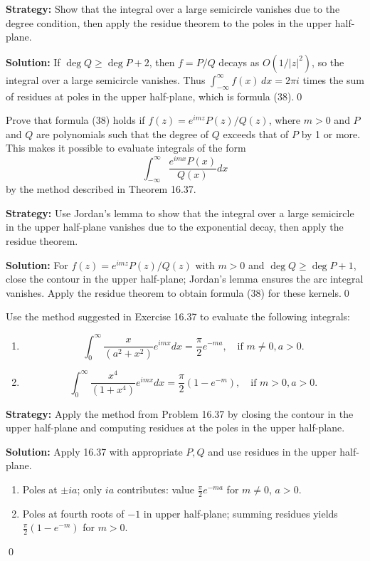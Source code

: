 \noindent\textbf{Strategy:} Show that the integral over a large semicircle vanishes due to the degree condition, then apply the residue theorem to the poles in the upper half-plane.

\bigskip\noindent\textbf{Solution:}
If $\deg Q\ge \deg P+2$, then $f=P/Q$ decays as $O(1/|z|^2)$, so the integral over a large semicircle vanishes. Thus $\int_{-\infty}^{\infty} f(x)\,dx=2\pi i$ times the sum of residues at poles in the upper half-plane, which is formula (38).\qed


\begin{problembox}
Prove that formula (38) holds if \( f(z) = e^{imz} P(z) / Q(z) \), where \( m > 0 \) and \( P \) and \( Q \) are polynomials such that the degree of \( Q \) exceeds that of \( P \) by 1 or more. This makes it possible to evaluate integrals of the form
\[ \int_{-\infty}^{\infty} \frac{e^{imx} P(x)}{Q(x)} dx \]
by the method described in Theorem 16.37.
\end{problembox}

\noindent\textbf{Strategy:} Use Jordan's lemma to show that the integral over a large semicircle in the upper half-plane vanishes due to the exponential decay, then apply the residue theorem.

\bigskip\noindent\textbf{Solution:}
For $f(z)=e^{imz}P(z)/Q(z)$ with $m>0$ and $\deg Q\ge \deg P+1$, close the contour in the upper half-plane; Jordan's lemma ensures the arc integral vanishes. Apply the residue theorem to obtain formula (38) for these kernels.\qed


\begin{problembox}
Use the method suggested in Exercise 16.37 to evaluate the following integrals:
\begin{enumerate}[label=(\alph*)]
\item \[ \int_0^{\infty} \frac{x}{(a^2 + x^2)} e^{imx} dx = \frac{\pi}{2} e^{-ma}, \quad \text{if } m \neq 0, a > 0. \]
\item \[ \int_0^{\infty} \frac{x^4}{(1 + x^4)} e^{imx} dx = \frac{\pi}{2} (1 - e^{-m}), \quad \text{if } m > 0, a > 0. \]
\end{enumerate}
\end{problembox}

\noindent\textbf{Strategy:} Apply the method from Problem 16.37 by closing the contour in the upper half-plane and computing residues at the poles in the upper half-plane.

\bigskip\noindent\textbf{Solution:}
Apply 16.37 with appropriate $P,Q$ and use residues in the upper half-plane.
\begin{enumerate}[label=(\alph*)]
\item Poles at $\pm ia$; only $ia$ contributes: value $\frac{\pi}{2}e^{-ma}$ for $m\ne0$, $a>0$.
\item Poles at fourth roots of $-1$ in upper half-plane; summing residues yields $\frac{\pi}{2}(1-e^{-m})$ for $m>0$.
\end{enumerate}\qed


